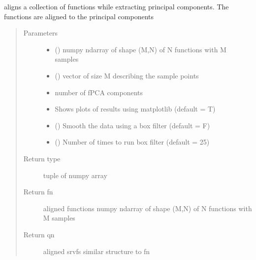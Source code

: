 \documentclass[letterpaper,10pt,english]{sphinxmanual}
\begin{document}
\begin{fulllineitems}
\label{\detokenize{time_warping:time_warping.align_fPCA}}
aligns a collection of functions while extracting principal components.
The functions are aligned to the principal components
\begin{quote}\begin{description}
\item[{Parameters}] \leavevmode\begin{itemize}
\item {} 
 () \textendash{} numpy ndarray of shape (M,N) of N functions with M samples

\item {} 
 () \textendash{} vector of size M describing the sample points

\item {} 
 \textendash{} number of fPCA components

\item {} 
 \textendash{} Shows plots of results using matplotlib (default = T)

\item {} 
 () \textendash{} Smooth the data using a box filter (default = F)

\item {} 
 () \textendash{} Number of times to run box filter (default = 25)

\end{itemize}

\item[{Return type}] \leavevmode
tuple of numpy array

\item[{Return fn}] \leavevmode
aligned functions \sphinxhyphen{} numpy ndarray of shape (M,N) of N
functions with M samples

\item[{Return qn}] \leavevmode
aligned srvfs \sphinxhyphen{} similar structure to fn


\end{description}
\end{quote}
\end{fulllineitems}
\end{document}

